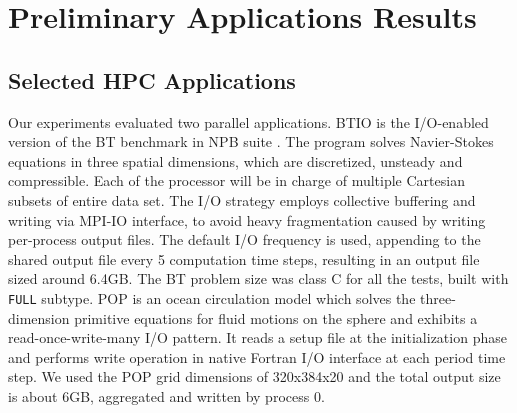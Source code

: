 \section{Preliminary Applications Results}
    \label{sec:perf}
    
    \subsection{Selected HPC Applications}
    Our experiments evaluated two parallel applications. BTIO is the
    I/O-enabled version of the BT benchmark in NPB suite \cite{wong:btio}.
    The program solves Navier-Stokes equations in three spatial dimensions,
    which are discretized, unsteady and compressible. Each of the processor
    will be in charge of multiple Cartesian subsets of entire data set. The
    I/O strategy employs collective buffering and writing via MPI-IO
    interface, to avoid heavy fragmentation caused by writing per-process
    output files. The default I/O frequency is used, appending to the shared
    output file every 5 computation time steps, resulting in an output file
    sized around 6.4GB.  The BT problem size was class C for all the tests,
    built with \texttt{FULL} subtype. POP is an ocean circulation model which
    solves the three-dimension primitive equations for fluid motions on the
    sphere \cite{website:pop} and exhibits a read-once-write-many I/O pattern.
    It reads a setup file at the initialization phase and performs write
    operation in native Fortran I/O interface at each period time step. We
    used the POP grid dimensions of 320x384x20 and the total output size is
    about 6GB, aggregated and written by process 0.

